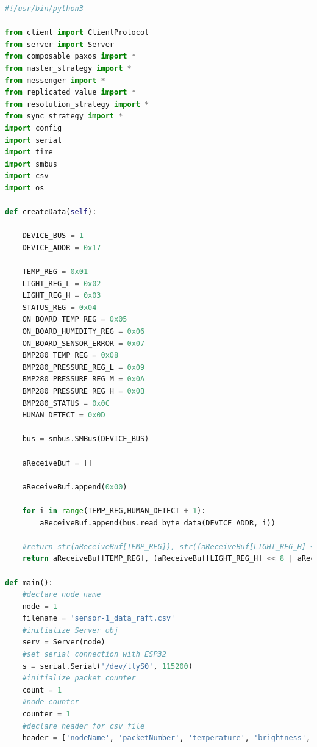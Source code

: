 \documentclass[oneside,12pt]{book}
\begin{document}
\begin{lstlisting}[language={Python},caption={Paxos Sender code - Python3},captionpos=b,label={lst:paxos_sender}]
#!/usr/bin/python3

from client import ClientProtocol
from server import Server
from composable_paxos import *
from master_strategy import *
from messenger import *
from replicated_value import *
from resolution_strategy import *
from sync_strategy import *
import config
import serial
import time
import smbus
import csv
import os

def createData(self):
	
	DEVICE_BUS = 1
	DEVICE_ADDR = 0x17

	TEMP_REG = 0x01
	LIGHT_REG_L = 0x02
	LIGHT_REG_H = 0x03
	STATUS_REG = 0x04
	ON_BOARD_TEMP_REG = 0x05
	ON_BOARD_HUMIDITY_REG = 0x06
	ON_BOARD_SENSOR_ERROR = 0x07
	BMP280_TEMP_REG = 0x08
	BMP280_PRESSURE_REG_L = 0x09
	BMP280_PRESSURE_REG_M = 0x0A
	BMP280_PRESSURE_REG_H = 0x0B
	BMP280_STATUS = 0x0C
	HUMAN_DETECT = 0x0D

	bus = smbus.SMBus(DEVICE_BUS)

	aReceiveBuf = []

	aReceiveBuf.append(0x00)

	for i in range(TEMP_REG,HUMAN_DETECT + 1):
		aReceiveBuf.append(bus.read_byte_data(DEVICE_ADDR, i))

	#return str(aReceiveBuf[TEMP_REG]), str((aReceiveBuf[LIGHT_REG_H] << 8 | aReceiveBuf[LIGHT_REG_L])), str(aReceiveBuf[ON_BOARD_HUMIDITY_REG]), str((aReceiveBuf[BMP280_PRESSURE_REG_L] | aReceiveBuf[BMP280_PRESSURE_REG_M] << 8 | aReceiveBuf[BMP280_PRESSURE_REG_H] << 16))
	return aReceiveBuf[TEMP_REG], (aReceiveBuf[LIGHT_REG_H] << 8 | aReceiveBuf[LIGHT_REG_L]), aReceiveBuf[ON_BOARD_HUMIDITY_REG], aReceiveBuf[ON_BOARD_TEMP_REG]
        
def main():
	#declare node name
    node = 1
    filename = 'sensor-1_data_raft.csv'
    #initialize Server obj
	serv = Server(node)
    #set serial connection with ESP32
    s = serial.Serial('/dev/ttyS0', 115200)
    #initialize packet counter
    count = 1
	#node counter
	counter = 1
    #declare header for csv file
    header = ['nodeName', 'packetNumber', 'temperature', 'brightness', 'humidity', 'onBoardTemp']  
   

\end{lstlisting}
\end{document}
